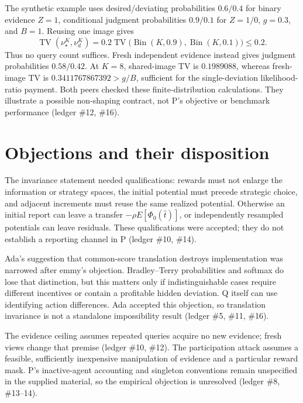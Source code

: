 \documentclass{article}
\begin{document}
The synthetic example uses desired/deviating probabilities \(0.6/0.4\) for binary evidence \(Z=1\),
conditional judgment probabilities \(0.9/0.1\) for \(Z=1/0\), \(g=0.3\), and \(B=1\). Reusing one image gives
\[
\operatorname{TV}(\nu_\star^K,\nu_d^K)
=0.2\operatorname{TV}\bigl(\operatorname{Bin}(K,0.9),
\operatorname{Bin}(K,0.1)\bigr)\leq0.2.
\]
Thus no query count suffices. Fresh independent evidence instead gives judgment probabilities \(0.58/0.42\).
At \(K=8\), shared-image TV is \(0.1989088\), whereas fresh-image TV is \(0.3411767867392>g/B\), sufficient
for the single-deviation likelihood-ratio payment. Both peers checked these finite-distribution calculations.
They illustrate a possible non-shaping contract, not P's objective or benchmark performance (ledger \#12,
\#16).

\section*{Objections and their disposition}
The invariance statement needed qualifications: rewards must not enlarge the information or strategy spaces,
the initial potential must precede strategic choice, and adjacent increments must reuse the same realized
potential. Otherwise an initial report can leave a transfer \(-\rho E[\Phi_0(\hat t)]\), or independently
resampled potentials can leave residuals. These qualifications were accepted; they do not establish a
reporting channel in P (ledger \#10, \#14).

Ada's suggestion that common-score translation destroys implementation was narrowed after emmy's objection.
Bradley--Terry probabilities and softmax do lose that distinction, but this matters only if indistinguishable
cases require different incentives or contain a profitable hidden deviation. Q itself can use identifying
action differences. Ada accepted this objection, so translation invariance is not a standalone impossibility
result (ledger \#5, \#11, \#16).

The evidence ceiling assumes repeated queries acquire no new evidence; fresh views change that premise (ledger
\#10, \#12). The participation attack assumes a feasible, sufficiently inexpensive manipulation of evidence
and a particular reward mask. P's inactive-agent accounting and singleton conventions remain unspecified in
the supplied material, so the empirical objection is unresolved (ledger \#8, \#13--14).
\end{document}
